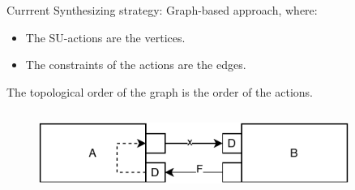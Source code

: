 \documentclass{beamer}
\begin{document}
\begin{frame}{Currrent Synthesizing strategy:}
    Graph-based approach, where:
    \begin{itemize}
        \item The SU-actions are the vertices.
        \item The constraints of the actions are the edges.
    \end{itemize}
    The topological order of the graph is the order of the actions. 
    \begin{columns}[T] %
        \begin{column}{.48\textwidth}
            \begin{figure}    
                \includegraphics[width=0.9\textwidth]{images/simple_example.pdf}
            \end{figure}
            \vspace{-5mm}


\end{column}
\end{columns}
\end{frame}
\end{document}
